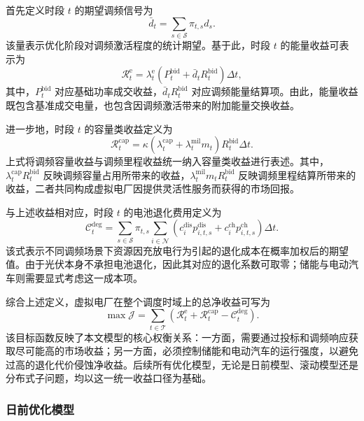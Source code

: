 首先定义时段 $t$ 的期望调频信号为
\begin{equation}
\bar d_t = \sum_{s \in \mathcal{S}} \pi_{t,s} d_s.
\end{equation}
该量表示优化阶段对调频激活程度的统计期望。基于此，时段 $t$ 的能量收益可表示为
\begin{equation}
\mathcal{R}_t^{\mathrm{e}} = \lambda_t^{\mathrm{e}} \left(P_t^{\mathrm{bid}} + \bar d_t R_t^{\mathrm{bid}}\right) \Delta t,
\end{equation}
其中，$P_t^{\mathrm{bid}}$ 对应基础功率成交收益，$\bar d_t R_t^{\mathrm{bid}}$ 对应调频能量结算项。由此，能量收益既包含基准成交电量，也包含因调频激活带来的附加能量交换收益。

进一步地，时段 $t$ 的容量类收益定义为
\begin{equation}
\mathcal{R}_t^{\mathrm{cap}} = \kappa \left(\lambda_t^{\mathrm{cap}} + \lambda_t^{\mathrm{mil}} m_t\right) R_t^{\mathrm{bid}} \Delta t.
\end{equation}
上式将调频容量收益与调频里程收益统一纳入容量类收益进行表述。其中，$\lambda_t^{\mathrm{cap}} R_t^{\mathrm{bid}}$ 反映调频容量占用所带来的收益，$\lambda_t^{\mathrm{mil}} m_t R_t^{\mathrm{bid}}$ 反映调频里程结算所带来的收益，二者共同构成虚拟电厂因提供灵活性服务而获得的市场回报。

与上述收益相对应，时段 $t$ 的电池退化费用定义为
\begin{equation}
\mathcal{C}_t^{\mathrm{deg}} = \sum_{s \in \mathcal{S}} \pi_{t,s} \sum_{i \in \mathcal{N}} \left(c_i^{\mathrm{dis}} p_{i,t,s}^{\mathrm{dis}} + c_i^{\mathrm{ch}} p_{i,t,s}^{\mathrm{ch}}\right) \Delta t.
\end{equation}
该式表示不同调频场景下资源因充放电行为引起的退化成本在概率加权后的期望值。由于光伏本身不承担电池退化，因此其对应的退化系数可取零；储能与电动汽车则需要显式考虑这一成本项。

综合上述定义，虚拟电厂在整个调度时域上的总净收益可写为
\begin{equation}
\max \mathcal{J} = \sum_{t \in \mathcal{T}} \left(\mathcal{R}_t^{\mathrm{e}} + \mathcal{R}_t^{\mathrm{cap}} - \mathcal{C}_t^{\mathrm{deg}}\right).
\end{equation}
该目标函数反映了本文模型的核心权衡关系：一方面，需要通过投标和调频响应获取尽可能高的市场收益；另一方面，必须控制储能和电动汽车的运行强度，以避免过高的退化代价侵蚀净收益。后续所有优化模型，无论是日前模型、滚动模型还是分布式子问题，均以这一统一收益口径为基础。

\subsubsection{日前优化模型}
\label{subsubsec:vpp_admm_model_two_stage_dayahead}

